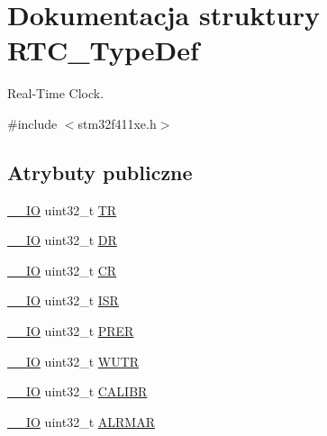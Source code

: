 \hypertarget{struct_r_t_c___type_def}{}\section{Dokumentacja struktury R\+T\+C\+\_\+\+Type\+Def}
\label{struct_r_t_c___type_def}


Real-\/\+Time Clock.  




{\ttfamily \#include $<$stm32f411xe.\+h$>$}

\subsection*{Atrybuty publiczne}
\begin{DoxyCompactItemize}
\item 
\hyperlink{core__sc300_8h_aec43007d9998a0a0e01faede4133d6be}{\+\_\+\+\_\+\+IO} uint32\+\_\+t \hyperlink{struct_r_t_c___type_def_a2e8783857f8644a4eb80ebc51e1cba42}{TR}
\item 
\hyperlink{core__sc300_8h_aec43007d9998a0a0e01faede4133d6be}{\+\_\+\+\_\+\+IO} uint32\+\_\+t \hyperlink{struct_r_t_c___type_def_a8750eae683cb3d382476dc7cdcd92b96}{DR}
\item 
\hyperlink{core__sc300_8h_aec43007d9998a0a0e01faede4133d6be}{\+\_\+\+\_\+\+IO} uint32\+\_\+t \hyperlink{struct_r_t_c___type_def_a731d9209ce40dce6ea61fcc6f818c892}{CR}
\item 
\hyperlink{core__sc300_8h_aec43007d9998a0a0e01faede4133d6be}{\+\_\+\+\_\+\+IO} uint32\+\_\+t \hyperlink{struct_r_t_c___type_def_a5a7b104d80b48b5708b50cdc487d6a78}{I\+SR}
\item 
\hyperlink{core__sc300_8h_aec43007d9998a0a0e01faede4133d6be}{\+\_\+\+\_\+\+IO} uint32\+\_\+t \hyperlink{struct_r_t_c___type_def_a5f43a11e0873212f598e41db5f2dcf6a}{P\+R\+ER}
\item 
\hyperlink{core__sc300_8h_aec43007d9998a0a0e01faede4133d6be}{\+\_\+\+\_\+\+IO} uint32\+\_\+t \hyperlink{struct_r_t_c___type_def_ad93017bb0a778a2aad9cd71211fc770a}{W\+U\+TR}
\item 
\hyperlink{core__sc300_8h_aec43007d9998a0a0e01faede4133d6be}{\+\_\+\+\_\+\+IO} uint32\+\_\+t \hyperlink{struct_r_t_c___type_def_a2403d29b2bfffb734ebef6642c0d2724}{C\+A\+L\+I\+BR}
\item 
\hyperlink{core__sc300_8h_aec43007d9998a0a0e01faede4133d6be}{\+\_\+\+\_\+\+IO} uint32\+\_\+t \hyperlink{struct_r_t_c___type_def_ad7e54d5c5a4b9fd1e26aca85b1e36c7f}{A\+L\+R\+M\+AR}
\item 

\end{DoxyCompactItemize}
